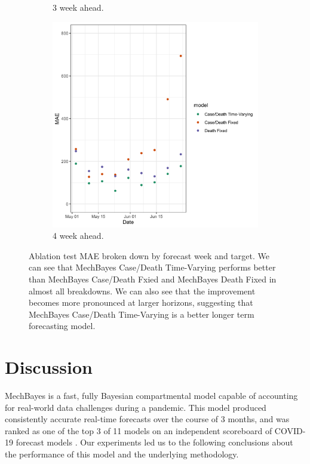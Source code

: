 \documentclass[11pt]{amsart}
\begin{document}
\begin{figure}
\begin{subfigure}{.5\textwidth}
    \caption{3 week ahead.}
\end{subfigure}%
\begin{subfigure}{.5\textwidth}
  \centering
    \includegraphics[scale=.15]{ablation_4.png}
    \caption{4 week ahead. }
\end{subfigure}

\caption{Ablation test MAE broken down by forecast week and target. We can see that MechBayes Case/Death Time-Varying performs better than MechBayes Case/Death Fxied and MechBayes Death Fixed in almost all breakdowns. We can also see that the improvement becomes more pronounced at larger horizons, suggesting that MechBayes Case/Death Time-Varying is a better longer term forecasting model.  }
\label{fig:ablation}
\end{figure}




\section{Discussion}

MechBayes is a fast, fully Bayesian compartmental model capable of accounting for real-world data challenges during a pandemic.  This model produced consistently accurate real-time forecasts over the course of 3 months, and was ranked as one of the top 3 of 11 models on an independent scoreboard of COVID-19 forecast models \cite{yyg}. Our experiments led us to the following conclusions about the performance of this model and the underlying methodology.
\end{document}
